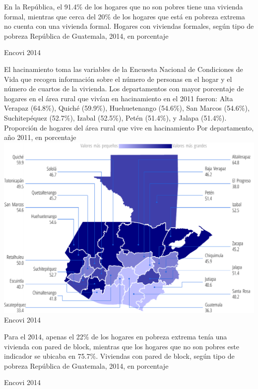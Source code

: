 
{%
	En la República, el 91.4\% de los hogares que no son pobres tiene una vivienda formal, mientras que cerca del 20\%  de los hogares que está en pobreza extrema no cuenta con una vivienda formal.  
 }%
{%
 Hogares con viviendas formales, según tipo de pobreza} %
{%
 República de Guatemala, 2014, en porcentaje} %
{%
 \begin{tikzpicture}[x=1pt,y=1pt]    \end{tikzpicture}}%
{%
 Encovi 2014} %




%
{%
	El hacinamiento toma las variables de la Encuesta Nacional de Condiciones de Vida que recogen información sobre el número de personas en el hogar y el número de cuartos de la vivienda. 	Los departamentos con mayor porcentaje de hogares en el área rural que vivían en hacinamiento en el 2011 fueron: Alta Verapaz (64.8\%), Quiché (59.9\%), Huehuetenango (54.6\%), San Marcos (54.6\%), Suchitepéquez (52.7\%), Izabal (52.5\%), Petén (51.4\%), y Jalapa (51.4\%). }%
{%
	Proporción de hogares del área rural que vive en hacinamiento
} %
{%
	Por departamento, año 2011, en porcentaje} %
{%
	\includegraphics[width=52\cuadri]{graficas/1_13.pdf}}%
{%
 Encovi 2014} %



%
{%
	Para el 2014, apenas el 22\% de los hogares en pobreza extrema tenía una vivienda con pared de block, mientras que los hogares que  no son pobres este indicador se ubicaba en 75.7\%. 
}%
{%
	Viviendas con pared de block, según tipo de pobreza} %
{%
	República de Guatemala, 2014, en porcentaje} %
{%
	\begin{tikzpicture}[x=1pt,y=1pt]    \end{tikzpicture}}%
{%
	Encovi 2014} %

